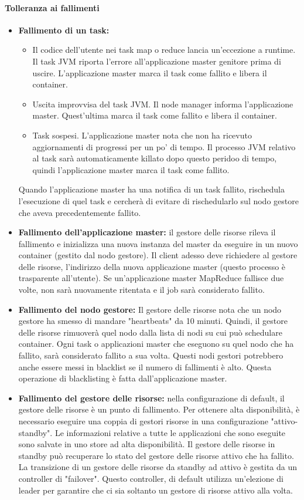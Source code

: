 \documentclass{article}
\begin{document}
\begin{appendices}
\paragraph{Tolleranza ai fallimenti}
\begin{itemize}
    \item \textbf{Fallimento di un task:} 
    \begin{itemize}
        \item Il codice dell'utente nei task map o reduce lancia un'eccezione a runtime. Il task JVM riporta l'errore all'applicazione master genitore prima di uscire. L'applicazione master marca il task come fallito e libera il container.
        \item Uscita improvvisa del task JVM. Il node manager informa l'applicazione master. Quest'ultima marca il task come fallito e libera il container.
        \item Task sospesi. L'applicazione master nota che non ha ricevuto aggiornamenti di progressi per un po' di tempo. Il processo JVM relativo al task sarà automaticamente killato dopo questo peridoo di tempo, quindi l'applicazione master marca il task come fallito.
    \end{itemize}
    Quando l'applicazione master ha una notifica di un task fallito, rischedula l'esecuzione di quel task e cercherà di evitare di rischedularlo sul nodo gestore che aveva precedentemente fallito.
    \item \textbf{Fallimento dell'applicazione master:} il gestore delle risorse rileva il fallimento e inizializza una nuova instanza del master da eseguire in un nuovo container (gestito dal nodo gestore). Il client adesso deve richiedere al gestore delle risorse, l'indirizzo della nuova applicazione master (questo processo è trasparente all'utente). Se un'applicazione master MapReduce fallisce due volte, non sarà nuovamente ritentata e il job sarà considerato fallito.
    \item \textbf{Fallimento del nodo gestore:} Il gestore delle risorse nota che un nodo gestore ha smesso di mandare "heartbeats" da 10 minuti. Quindi, il gestore delle risorse rimuoverà quel nodo dalla lista di nodi su cui può schedulare container. Ogni task o applicazioni master che eseguono su quel nodo che ha fallito, sarà considerato fallito a sua volta. Questi nodi gestori potrebbero anche essere messi in blacklist se il numero di fallimenti è alto. Questa operazione di blacklisting è fatta dall'applicazione master.
    \item \textbf{Fallimento del gestore delle risorse:} nella configurazione di default, il gestore delle risorse è un punto di fallimento. Per ottenere alta disponibilità, è necessario eseguire una coppia di gestori risorse in una configurazione "attivo-standby". Le informazioni relative a tutte le applicazioni che sono eseguite sono salvate in uno store ad alta disponibilità. Il gestore delle risorse in standby può recuperare lo stato del gestore delle risorse attivo che ha fallito. La transizione di un gestore delle risorse da standby ad attivo è gestita da un controller di "failover". Questo controller, di default utilizza un'elezione di leader per garantire che ci sia soltanto un gestore di risorse attivo alla volta.

\end{itemize}
\end{appendices}
\end{document}
